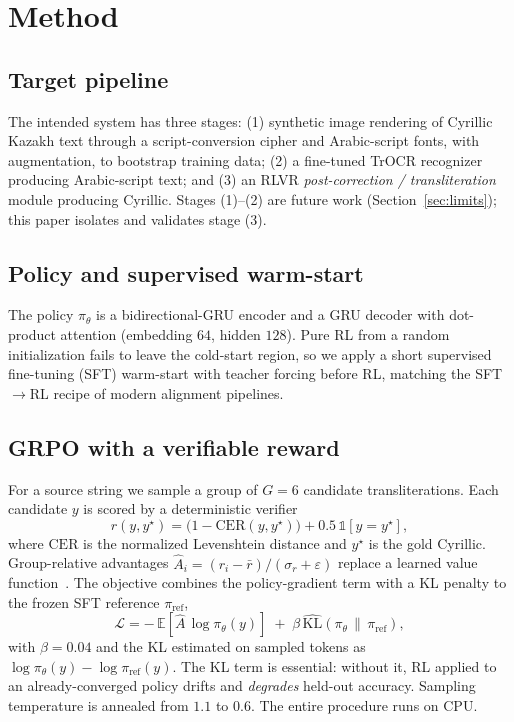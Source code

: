 \documentclass[conference]{IEEEtran}
\begin{document}
\section{Method}
\subsection{Target pipeline}
The intended system has three stages: (1) synthetic image rendering of Cyrillic
Kazakh text through a script-conversion cipher and Arabic-script fonts, with
augmentation, to bootstrap training data; (2) a fine-tuned TrOCR recognizer
producing Arabic-script text; and (3) an RLVR \emph{post-correction /
transliteration} module producing Cyrillic. Stages (1)--(2) are future work
(Section~\ref{sec:limits}); this paper isolates and validates stage (3).

\subsection{Policy and supervised warm-start}
The policy $\pi_\theta$ is a bidirectional-GRU encoder and a GRU decoder with
dot-product attention (embedding $64$, hidden $128$). Pure RL from a random
initialization fails to leave the cold-start region, so we apply a short
supervised fine-tuning (SFT) warm-start with teacher forcing before RL, matching
the SFT$\rightarrow$RL recipe of modern alignment pipelines.

\subsection{GRPO with a verifiable reward}
For a source string we sample a group of $G=6$ candidate transliterations. Each
candidate $y$ is scored by a deterministic verifier
\begin{equation}
r(y, y^\star) = \bigl(1 - \mathrm{CER}(y, y^\star)\bigr) + 0.5\,\mathbb{1}[y = y^\star],
\end{equation}
where $\mathrm{CER}$ is the normalized Levenshtein distance and $y^\star$ is the
gold Cyrillic. Group-relative advantages
$\hat{A}_i = (r_i - \bar{r})/(\sigma_r + \varepsilon)$ replace a learned value
function~\cite{deepseekmath}. The objective combines the policy-gradient term with
a KL penalty to the frozen SFT reference $\pi_{\mathrm{ref}}$,
\begin{equation}
\mathcal{L} = -\,\mathbb{E}\!\left[\hat{A}\,\log \pi_\theta(y)\right]
\;+\; \beta\,\widehat{\mathrm{KL}}\!\left(\pi_\theta \,\|\, \pi_{\mathrm{ref}}\right),
\end{equation}
with $\beta = 0.04$ and the KL estimated on sampled tokens as
$\log\pi_\theta(y) - \log\pi_{\mathrm{ref}}(y)$. The KL term is essential: without
it, RL applied to an already-converged policy drifts and \emph{degrades} held-out
accuracy. Sampling temperature is annealed from $1.1$ to $0.6$. The entire
procedure runs on CPU.
\end{document}
